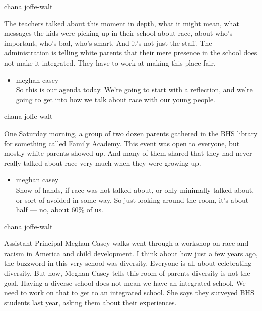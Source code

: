 chana joffe-walt

The teachers talked about this moment in depth, what it might mean, what
messages the kids were picking up in their school about race, about
who's important, who's bad, who's smart. And it's not just the staff.
The administration is telling white parents that their mere presence in
the school does not make it integrated. They have to work at making this
place fair.

\begin{itemize}
\tightlist
\item
  meghan casey\\
  So this is our agenda today. We're going to start with a reflection,
  and we're going to get into how we talk about race with our young
  people.
\end{itemize}

chana joffe-walt

One Saturday morning, a group of two dozen parents gathered in the BHS
library for something called Family Academy. This event was open to
everyone, but mostly white parents showed up. And many of them shared
that they had never really talked about race very much when they were
growing up.

\begin{itemize}
\tightlist
\item
  meghan casey\\
  Show of hands, if race was not talked about, or only minimally talked
  about, or sort of avoided in some way. So just looking around the
  room, it's about half --- no, about 60\% of us.
\end{itemize}

chana joffe-walt

Assistant Principal Meghan Casey walks went through a workshop on race
and racism in America and child development. I think about how just a
few years ago, the buzzword in this very school was diversity. Everyone
is all about celebrating diversity. But now, Meghan Casey tells this
room of parents diversity is not the goal. Having a diverse school does
not mean we have an integrated school. We need to work on that to get to
an integrated school. She says they surveyed BHS students last year,
asking them about their experiences.


